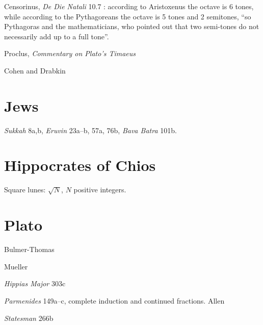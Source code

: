 \documentclass{article}
\theoremstyle{definition}
\begin{document}
Censorinus, {\em De Die Natali} 10.7 \cite[p.~18]{censorinus}: according to Aristoxenus the octave is 6 tones, while
according to the Pythagoreans the octave is 5 tones and 2 semitones, ``so Pythagoras and the mathematicians, who pointed
out that two semi-tones do not necessarily add up to a full tone''.


Proclus, {\em Commentary on Plato's Timaeus} \cite{timaeum3II}

Cohen and Drabkin \cite[p.~286]{drabkin}







\section{Jews}
{\em Sukkah} 8a,b, {\em Eruvin} 23a--b, 57a, 76b, {\em Bava Batra} 101b.





\section{Hippocrates of Chios}
Square lunes: $\sqrt{N}$, $N$ positive integers.






\section{Plato}
Bulmer-Thomas \cite{bulmer-thomas}

Mueller \cite{mueller2003}

{\em Hippias Major} 303c

{\em Parmenides} 149a--c, complete induction and continued fractions. Allen \cite[pp.~238--258]{allen}

{\em Statesman} 266b
\end{document}
